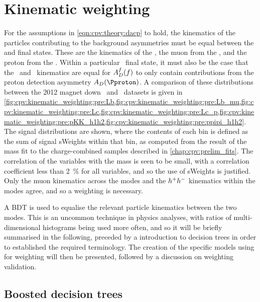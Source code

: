 \chapter{Kinematic weighting}
\label{chap:cpv:kinematic_weighting}

For the assumptions in \cref{eqn:cpv:theory:dacp} to hold, the
kinematics of the particles contributing to the background asymmetries must be 
equal between the \pKK and \ppipi final states.
These are the kinematics of the \PLambdab, the muon from the \PLambdab, and the 
proton from the \PLambdac.
Within a particular \phh\ final state, it must also be the case that the \Php\ 
and \Phm\ kinematics are equal for $A_{D}^{f}(f)$ to only contain contributions from 
the proton detection asymmetry $\AD(\Pproton)$.
A comparison of these distributions between the 2012 magnet down \pKK\ and 
\ppipi\ datasets is given in 
\cref{fig:cpv:kinematic_weighting:pre:Lb,fig:cpv:kinematic_weighting:pre:Lb_mu,fig:cpv:kinematic_weighting:pre:Lc,fig:cpv:kinematic_weighting:pre:Lc_p,fig:cpv:kinematic_weighting:pre:pKK_h1h2,fig:cpv:kinematic_weighting:pre:ppipi_h1h2}.
The signal distributions are shown, where the contents of each bin is defined 
as the sum of signal sWeights within that bin, as computed from the result of 
the mass fit to the charge-combined samples described in 
\cref{chap:cpv:prelim_fits}.
The correlation of the variables with the \PLambdac mass is seen to be small, 
with a correlation coefficient less than \SI{2}{\percent} for all variables, 
and so the use of sWeights is justified.
Only the muon kinematics across the modes and the $h^{+}h^{-}$ kinematics within 
the modes agree, and so a weighting is necessary.

A \acf{BDT} is used to equalise the relevant particle kinematics between the 
two modes.
This is an uncommon technique in physics analyses, with ratios of 
multi-dimensional histograms being used more often, and so it will be briefly 
summarised in the following, preceded by a introduction to decision trees in 
order to established the required terminology.
The creation of the specific models using for weighting will then be presented, 
followed by a discussion on weighting validation.

\section{Boosted decision trees}
\label{chap:cpv:kinematic_weighting:bdt_theory}

